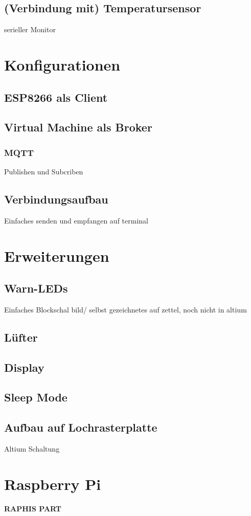 \documentclass[paper=a4, 12pt]{scrreprt}
\begin{document}
\section{(Verbindung mit) Temperatursensor}
serieller Monitor

\chapter{Konfigurationen}
\section{ESP8266 als Client}
\section{Virtual Machine als Broker}
\subsection{MQTT}
Publishen und Subcriben
\section{Verbindungsaufbau}
Einfaches senden und empfangen auf terminal

\chapter{Erweiterungen} 
\section{Warn-LEDs}
Einfaches Blockschal bild/ selbst gezeichnetes auf zettel, noch nicht in altium
\section{Lüfter}
\section{Display}
\section{Sleep Mode}
\section{Aufbau auf Lochrasterplatte}
Altium Schaltung

\chapter{Raspberry Pi}
\textbf{RAPHIS PART}
\end{document}
